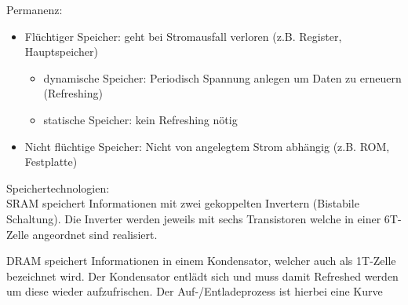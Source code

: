 \documentclass[a4paper,12pt,leqno]{article}
\begin{document}
Permanenz:
\begin{itemize}
\item Flüchtiger Speicher: geht bei Stromausfall verloren (z.B. Register, Hauptspeicher)
	\begin{itemize}
	\item dynamische Speicher: Periodisch Spannung anlegen um Daten zu erneuern (Refreshing)
	\item statische Speicher: kein Refreshing nötig
	\end{itemize}
\item Nicht flüchtige Speicher: Nicht von angelegtem Strom abhängig (z.B. ROM, Festplatte)
\end{itemize}

Speichertechnologien:\\

SRAM speichert Informationen mit zwei gekoppelten Invertern (Bistabile Schaltung). Die Inverter werden jeweils mit sechs Transistoren welche in einer 6T-Zelle angeordnet sind realisiert.

DRAM speichert Informationen in einem Kondensator, welcher auch als 1T-Zelle bezeichnet wird. Der Kondensator entlädt sich und muss damit Refreshed werden um diese wieder aufzufrischen. Der Auf-/Entladeprozess ist hierbei eine Kurve\\
\end{document}
